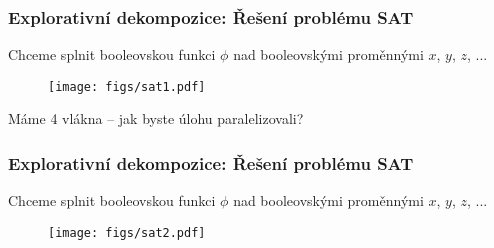 \documentclass[usenames,dvipsnames,9pt]{beamer}
\begin{document}
    









  
  

\begin{frame}[t]
	\frametitle{Explorativní dekompozice: Řešení problému SAT}

	Chceme splnit booleovskou funkci $\phi$ nad booleovskými proměnnými $x$, $y$, $z$, ...
	\begin{figure}
		\centering\texttt{[image: figs/sat1.pdf]}
	\end{figure}

	\vspace{1em}
	\begin{center}
		\Large Máme 4 vlákna -- jak byste úlohu paralelizovali?
	\end{center}
\end{frame}

\begin{frame}[t]
	\frametitle{Explorativní dekompozice: Řešení problému SAT}

	Chceme splnit booleovskou funkci $\phi$ nad booleovskými proměnnými $x$, $y$, $z$, ...
	\begin{figure}
		\centering\texttt{[image: figs/sat2.pdf]}
	\end{figure}
\end{frame}
\end{document}

